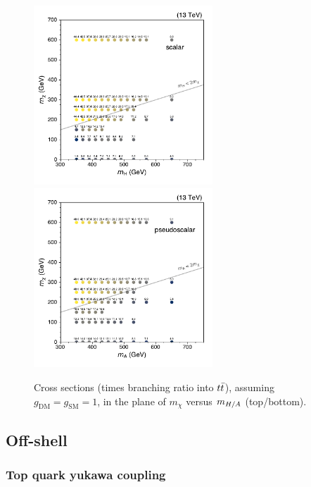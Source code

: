 \begin{figure}[htb!]
    \centering
    \includegraphics[width=0.60\textwidth]{figs/ftan/plot_2d_dmscalar_xsec_totsm} \\
    \includegraphics[width=0.60\textwidth]{figs/ftan/plot_2d_dmpseudo_xsec_totsm}
\caption{Cross sections (times branching ratio into $t\bar{t}$), assuming
$g_\mathrm{DM}=g_\mathrm{SM}=1$, in the plane of $m_\chi$ versus $m_{H/A}$ (top/bottom).
}
\label{fig:dm_2d_xsecs}
\end{figure}



\FloatBarrier

\subsection{Off-shell}

\subsubsection{Top quark yukawa coupling}

